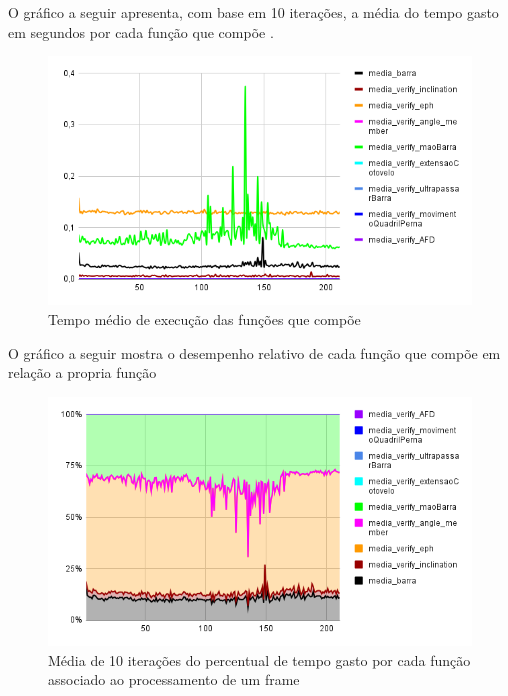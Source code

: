 O gráfico a seguir apresenta, com base em 10 iterações, a média do tempo gasto em segundos por cada função que compõe .

\begin{figure}[H]
	\centering
	\caption{Tempo médio de execução das funções que compõe }
	\includegraphics[scale=0.7]{figuras/grafico/comp_process_cell_2.png}
\end{figure}


O gráfico a seguir mostra o desempenho relativo de cada função que compõe  em relação a propria função 

\begin{figure}[H]
	\centering
	\caption{Média de 10 iterações do percentual de tempo gasto por cada função associado ao processamento de um frame}
	\includegraphics[scale=0.7]{figuras/grafico/comp_process_cell_1.png}
\end{figure}






